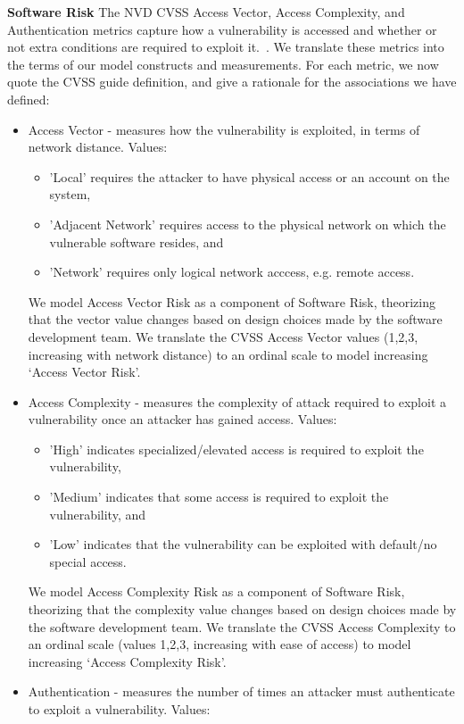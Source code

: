 \textbf{Software Risk}
\label{sec:evaluation_openhub_selection_risk}
The NVD CVSS Access Vector, Access Complexity, and Authentication metrics capture how a vulnerability is accessed and whether or not extra conditions are required to exploit it.~\cite{mell2007complete}. We translate these metrics into the terms of our model constructs and measurements. For each metric, we now quote the CVSS guide definition, and give a rationale for the associations we have defined:
\begin{itemize}
	\item Access Vector - measures how the vulnerability is exploited, in terms of network distance. Values:
	\begin{itemize}
		\item 'Local' requires the attacker to have physical access or an account on the system, \item 'Adjacent Network' requires access to the physical network on which the vulnerable software resides, and \item 'Network' requires only logical network acccess, e.g. remote access. 
	\end{itemize}
	We model Access Vector Risk as a component of Software Risk, theorizing that the vector value changes based on design choices made by the software development team. We translate the CVSS Access Vector values (1,2,3, increasing with network distance) to an ordinal scale to model increasing `Access Vector Risk'.
	\item Access Complexity - measures the complexity of attack required to exploit a vulnerability once an attacker has gained access. Values: 
	\begin{itemize}
		\item 'High' indicates specialized/elevated access is required to exploit the vulnerability, 
		\item 'Medium' indicates that some access is required to exploit the vulnerability, and \item 'Low' indicates that the vulnerability can be exploited with default/no special access.  
	\end{itemize}
	We model Access Complexity Risk as a component of Software Risk, theorizing that the complexity value changes based on design choices made by the software development team. We translate the CVSS Access Complexity  to an ordinal scale (values 1,2,3, increasing with ease of access) to model increasing `Access Complexity Risk'.
	\item Authentication - measures the number of times an attacker must authenticate to exploit a vulnerability. Values: 

\end{itemize}
